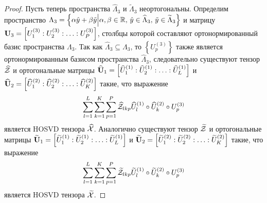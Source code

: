 \documentclass[specialist,
    substylefile = spbu_report.rtx,
    subf,href,colorlinks=true, 12pt]{disser}
\theoremstyle{plain}
\theoremstyle{definition}
\theoremstyle{remark}
\begin{document}
\begin{proof}
        Пусть теперь пространства $\widehat{\Lambda}_3$ и $\widetilde{\Lambda}_3$ 
        неортогональны.
        Определим пространство $\Lambda_3 = \left\{\alpha\hat{y} + \beta\tilde{y} \middle|
        \alpha, \beta \in \mathbb{R},\, \hat{y} \in \widehat{\Lambda}_3,\, \tilde{y} \in 
        \widetilde{\Lambda}_3 \right\}$ и матрицу $\mathbf{U}_3 = \left[U_1^{(3)}: U_2^{(3)}:
        \ldots : U_P^{(3)} \right]$, столбцы которой составляют ортонормированный базис пространства
        $\Lambda_3$.
        Так как $\widehat{\Lambda}_3 \subseteq \Lambda_3$, то $\left\{U_p^{(3)}\right\}$ 
        также является ортонормированным базисом пространства $\widehat{\Lambda}_3$,
        следовательно существуют тензор $\widehat{\mathcal{Z}}$ и ортогональные матрицы
        $\widehat{\mathbf{U}}_1 = \left[\widehat{U}_1^{(1)}:\widehat{U}_2^{(1)} :
        \ldots: \widehat{U}_L^{(1)}\right]$ и \linebreak
        $\widehat{\mathbf{U}}_2 = \left[\widehat{U}_1^{(2)}:\widehat{U}_2^{(2)} :
        \ldots: \widehat{U}_K^{(2)}\right]$ такие, что выражение
        \[
            \sum_{l=1}^{L} \sum_{k=1}^{K} \sum_{p=1}^{P} \widehat{\mathcal{Z}}_{lkp} \widehat{U}^{(1)}_{l}
                \circ \widehat{U}^{(2)}_{k} \circ U^{(3)}_{p}
        \]
        является HOSVD тензора $\widehat{\mathcal{X}}$.
        Аналогично существуют тензор $\widetilde{\mathcal{Z}}$ и ортогональные матрицы
        $\widetilde{\mathbf{U}}_1 = \left[\widetilde{U}_1^{(1)}:\widetilde{U}_2^{(1)} :
        \ldots: \widetilde{U}_L^{(1)}\right]$ и 
        $\widetilde{\mathbf{U}}_2 = \left[\widetilde{U}_1^{(2)}:\widetilde{U}_2^{(2)} :
        \ldots: \widetilde{U}_K^{(2)}\right]$ такие, что выражение 
        \[
            \sum_{l=1}^{L} \sum_{k=1}^{K} \sum_{p=1}^{P} \widetilde{\mathcal{Z}}_{lkp} 
            \widetilde{U}^{(1)}_{l} \circ \widetilde{U}^{(2)}_{k} \circ U^{(3)}_{p}
        \]
        является HOSVD тензора $\widetilde{\mathcal{X}}$.
        

\end{proof}
\end{document}
